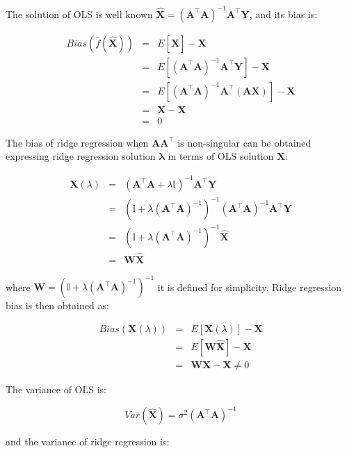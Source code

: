 The solution of OLS is well known $\hat{\mathbf{X}}=(\mathbf{A}^\top \mathbf{A})^{-1}\mathbf{A}^\top \mathbf{Y}$, and its bias is:

\begin{eqnarray*}
Bias(\hat{f}(\hat{\mathbf{X}})) &=& E[\hat{\mathbf{X}}] - \mathbf{X} \\
&=& E[ (\mathbf{A}^\top \mathbf{A})^{-1}\mathbf{A}^\top \mathbf{Y}] - \mathbf{X} \\
&=& E[ (\mathbf{A}^\top \mathbf{A})^{-1}\mathbf{A}^\top (\mathbf{AX})] - \mathbf{X}  \\
&=& \mathbf{X}  - \mathbf{X}  \\
&=&  0
\end{eqnarray*}


The bias of ridge regression when $\mathbf{A A^\top}$ is non-singular
can be obtained expressing ridge regression solution
$\mathbf{\lambda}$ in terms of OLS solution $\hat{\mathbf{X}}$:

\begin{eqnarray*}
\mathbf{X}(\lambda) &=&( \mathbf{A}^\top \mathbf{A} + \lambda \mathbb{I})^{-1}\mathbf{A}^\top \mathbf{Y} \\
&=& (\mathbb{I} + \lambda (\mathbf{A}^\top \mathbf{A})^{-1})^{-1} (\mathbf{A}^\top \mathbf{A})^{-1}\mathbf{A}^\top \mathbf{Y} \\
&=&  (\mathbb{I} + \lambda (\mathbf{A}^\top \mathbf{A})^{-1})^{-1}  \hat{\mathbf{X}} \\
&=& \mathbf{W} \hat{\mathbf{X}} 
\end{eqnarray*}

\noindent where $\mathbf{W}  = (\mathbb{I} + \lambda (\mathbf{A}^\top
\mathbf{A})^{-1})^{-1}  $ it is defined for simplicity. Ridge
regression bias is then obtained as:

\begin{eqnarray*}
Bias(\mathbf{X}(\lambda)) &=& E[\mathbf{X}(\lambda)] - \mathbf{X} \\
&=& E[\mathbf{W}\hat{\mathbf{X}}] - \mathbf{X} \\
&=&  \mathbf{W} \mathbf{X} - \mathbf{X} \neq 0 
\end{eqnarray*}


The variance of OLS is:

\begin{equation*}
Var(\hat{\mathbf{X}}) = \sigma^2 (\mathbf{A}^\top \mathbf{A} )^{-1}
\end{equation*}

\noindent and the variance of ridge regression is:

